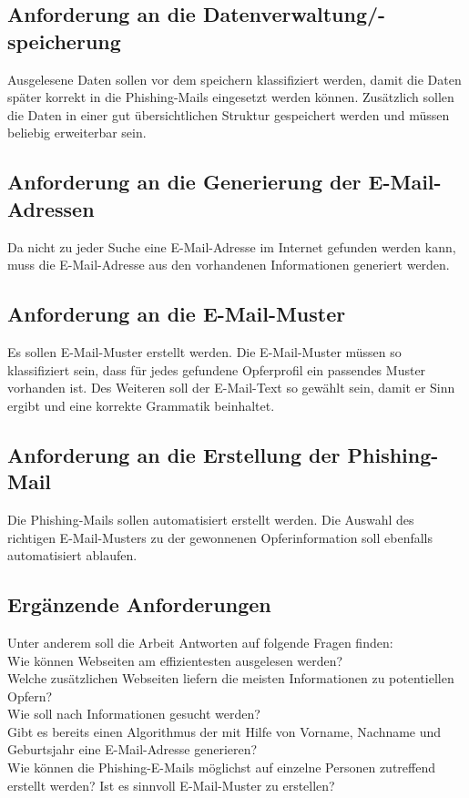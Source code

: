 	\subsection{Anforderung an die Datenverwaltung/-speicherung}
	Ausgelesene Daten sollen vor dem speichern klassifiziert werden, damit die Daten später korrekt in die Phishing-Mails eingesetzt werden können. Zusätzlich sollen die Daten in einer gut übersichtlichen Struktur gespeichert werden und müssen beliebig erweiterbar sein.
	
	\subsection{Anforderung an die Generierung der E-Mail-Adressen}
	Da nicht zu jeder Suche eine E-Mail-Adresse im Internet gefunden werden kann, muss die E-Mail-Adresse aus den vorhandenen Informationen generiert werden.
	
	\subsection{Anforderung an die E-Mail-Muster}
	Es sollen E-Mail-Muster erstellt werden. Die E-Mail-Muster müssen so klassifiziert sein, dass für jedes gefundene Opferprofil ein passendes Muster vorhanden ist. Des Weiteren soll der E-Mail-Text so gewählt sein, damit er Sinn ergibt und eine korrekte Grammatik beinhaltet.
	
	\subsection{Anforderung an die Erstellung der Phishing-Mail}
	Die Phishing-Mails sollen automatisiert erstellt werden. Die Auswahl des richtigen E-Mail-Musters zu der gewonnenen Opferinformation soll ebenfalls automatisiert ablaufen.
	
	\subsection{Ergänzende Anforderungen}
	Unter anderem soll die Arbeit Antworten auf folgende Fragen finden:\\
	Wie können Webseiten am effizientesten ausgelesen werden?\\
	Welche zusätzlichen Webseiten liefern die meisten Informationen zu potentiellen Opfern?\\
	Wie soll nach Informationen gesucht werden?\\
	Gibt es bereits einen Algorithmus der mit Hilfe von Vorname, Nachname und Geburtsjahr eine E-Mail-Adresse generieren?\\
	Wie können die Phishing-E-Mails möglichst auf einzelne Personen zutreffend erstellt werden? Ist es sinnvoll E-Mail-Muster zu erstellen?\\

